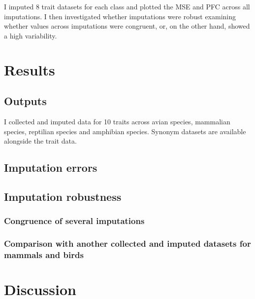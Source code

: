 I imputed 8 trait datasets for each class and plotted the MSE and PFC across all imputations. I then investigated whether imputations were robust examining whether values across imputations were congruent, or, on the other hand, showed a high variability.


\pagebreak
\section{Results}

\subsection{Outputs}
I collected and imputed data for 10 traits across avian species, mammalian species, reptilian species and amphibian species. Synonym datasets are available alongside the trait data.  

\subsection{Imputation errors}

\subsection{Imputation robustness}

\subsubsection{Congruence of several imputations}

\subsubsection{Comparison with another collected and imputed datasets for mammals and birds}

\pagebreak
\section{Discussion}


